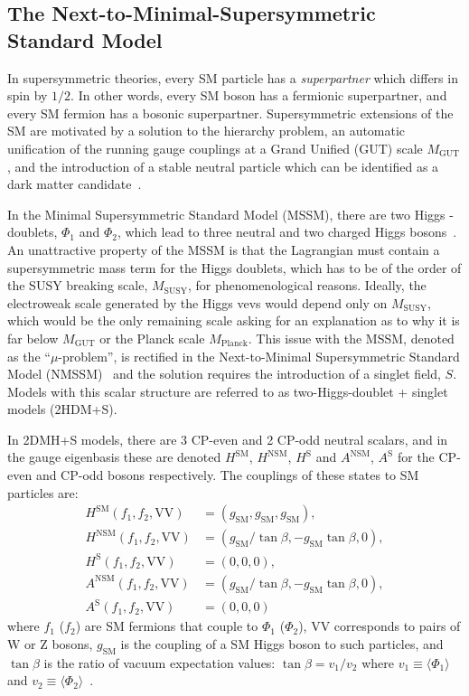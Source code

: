 \subsection{The Next-to-Minimal-Supersymmetric Standard Model}\label{sec:susy}
In supersymmetric theories, every SM particle has a \textit{superpartner} which differs in spin by $1/2$. In other words, every SM boson has a fermionic superpartner, and every SM fermion has a bosonic superpartner. Supersymmetric extensions of the SM are motivated by a solution to the hierarchy problem, an automatic unification of the running gauge couplings at a Grand Unified (GUT) scale $M_{\text{GUT}}$, and the introduction of a stable neutral particle which can be identified as a dark matter candidate~\cite{Ellwanger:2009dp}. 

In the Minimal Supersymmetric Standard Model (MSSM), there are two Higgs -doublets, $\Phi_1$ and $\Phi_2$, which lead to three neutral and two charged Higgs bosons~\cite{Fayet:1974pd,Fayet:1977yc}. An unattractive property of the MSSM is that the Lagrangian must contain a supersymmetric mass term for the Higgs doublets, which has to be of the order of the SUSY breaking scale, $M_{\text{SUSY}}$, for phenomenological reasons. Ideally, the electroweak scale generated by the Higgs vevs would depend only on $M_{\text{SUSY}}$, which would be the only remaining scale asking for an explanation as to why it is far below $M_{\text{GUT}}$ or the Planck scale $M_{\text{Planck}}$. This issue with the MSSM, denoted as the ``$\mu$-problem'', is rectified in the Next-to-Minimal Supersymmetric Standard Model (NMSSM)~\cite{Ellwanger:2009dp} and the solution requires the introduction of a singlet field, $S$. Models with this scalar structure are referred to as two-Higgs-doublet + singlet models (2HDM+S).

In 2DMH+S models, there are 3 CP-even and 2 CP-odd neutral scalars, and in the gauge eigenbasis these are denoted $H^{\text{SM}}$, $H^{\text{NSM}}$, $H^{\text{S}}$ and $A^{\text{NSM}}$, $A^{\text{S}}$ for the CP-even and CP-odd bosons respectively. The couplings of these states to SM particles are:
\begin{align*}
    H^{\text{SM}}(f_1,f_2,\mathrm{VV}) &= (g_{\text{SM}}, g_{\text{SM}}, g_{\text{SM}}), \\
    H^{\text{NSM}}(f_1,f_2,\mathrm{VV}) &= (g_{\text{SM}}/\tan{\beta}, -g_{\text{SM}}\tan{\beta}, 0), \\
    H^{\text{S}}(f_1,f_2,\mathrm{VV}) &= (0,0,0), \\
    A^{\text{NSM}}(f_1,f_2,\mathrm{VV}) &= (g_{\text{SM}}/\tan{\beta}, -g_{\text{SM}}\tan{\beta}, 0), \\
    A^{\text{S}}(f_1,f_2,\mathrm{VV}) &= (0,0,0)
\end{align*}
where $f_1$ ($f_2$) are SM fermions that couple to $\Phi_1$ ($\Phi_2$), $\mathrm{VV}$ corresponds to pairs of $\mathrm{W}$ or $\mathrm{Z}$ bosons, $g_{\text{SM}}$ is the coupling of a SM Higgs boson to such particles, and $\tan{\beta}$ is the ratio of vacuum expectation values: $\tan{\beta}=v_1/v_2$ where $v_1\equiv \langle \Phi_1 \rangle$ and  $v_2 \equiv \langle \Phi_2 \rangle$~\cite{Baum:2018zhf}.

